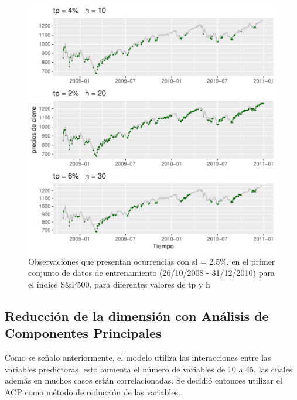 \documentclass[a4paper,12pt]{Latex/Classes/PhDthesisPSnPDF}
\begin{document}
\begin{figure}[H]
\centering
\includegraphics{main-006}
\caption{Observaciones que presentan ocurrencias con sl = 2.5\%, en el primer conjunto de datos de entrenamiento (26/10/2008 - 31/12/2010) para el índice S&P500, para diferentes valores de tp y h}
\end{figure}

\subsection{Reducción de la dimensión con Análisis de Componentes Principales}

Como se señalo anteriormente, el modelo utiliza las interacciones entre las variables predictoras, esto aumenta el número de variables de 10 a 45, las cuales además en muchos casos están correlacionadas. Se decidió entonces utilizar el ACP como método de reducción de las variables.
\end{document}
